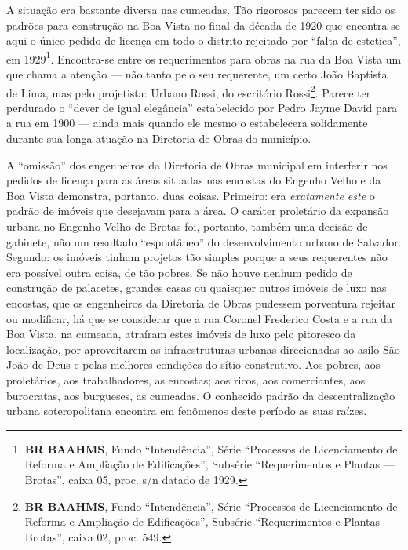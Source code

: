 A situação era bastante diversa nas cumeadas. Tão rigorosos parecem ter sido os padrões para construção na Boa Vista no final da década de 1920 que encontra-se aqui o único pedido de licença em todo o distrito rejeitado por ``falta de estetica'', em 1929\footnote{\textbf{BR BAAHMS}, Fundo ``Intendência'', Série ``Processos de Licenciamento de Reforma e Ampliação de Edificações'', Subsérie ``Requerimentos e Plantas --- Brotas'', caixa 05, proc. s/n datado de 1929.}. Encontra-se entre os requerimentos para obras na rua da Boa Vista um que chama a atenção --- não tanto pelo seu requerente, um certo João Baptista de Lima, mas pelo projetista: Urbano Rossi, do escritório Rossi\footnote{\textbf{BR BAAHMS}, Fundo ``Intendência'', Série ``Processos de Licenciamento de Reforma e Ampliação de Edificações'', Subsérie ``Requerimentos e Plantas --- Brotas'', caixa 02, proc. 549.}. Parece ter perdurado o ``dever de igual elegância'' estabelecido por Pedro Jayme David para a rua em 1900 --- ainda mais quando ele mesmo o estabelecera solidamente durante sua longa atuação na Diretoria de Obras do município.

A ``omissão'' dos engenheiros da Diretoria de Obras municipal em interferir nos pedidos de licença para as áreas situadas nas encostas do Engenho Velho e da Boa Vista demonstra, portanto, duas coisas. Primeiro: era \textit{exatamente este} o padrão de imóveis que desejavam para a área. O caráter proletário da expansão urbana no Engenho Velho de Brotas foi, portanto, também uma decisão de gabinete, não um resultado ``espontâneo'' do desenvolvimento urbano de Salvador. Segundo: os imóveis tinham projetos tão simples porque a seus requerentes não era possível outra coisa, de tão pobres. Se não houve nenhum pedido de construção de palacetes, grandes casas ou quaisquer outros imóveis de luxo nas encostas, que os engenheiros da Diretoria de Obras pudessem porventura rejeitar ou modificar, há que se considerar que a rua Coronel Frederico Costa e a rua da Boa Vista, na cumeada, atraíram estes imóveis de luxo pelo pitoresco da localização, por aproveitarem as infraestruturas urbanas direcionadas ao asilo São João de Deus e pelas melhores condições do sítio construtivo. Aos pobres, aos proletários, aos trabalhadores, as encostas; aos ricos, aos comerciantes, aos burocratas, aos burgueses, as cumeadas. O conhecido padrão da descentralização urbana soteropolitana encontra em fenômenos deste período as suas raízes.


